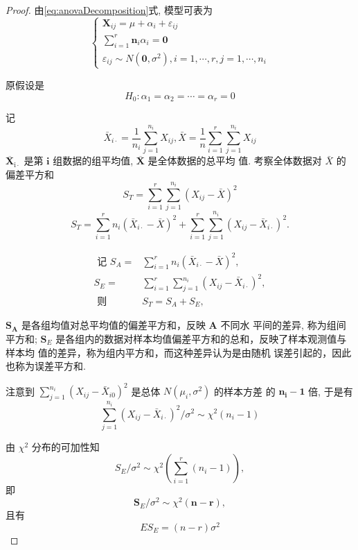 \begin{proof}
    由\cref{eq:anovaDecomposition}式, 模型可表为
    $$
    \left\{\begin{array}{l}
    \boldsymbol{X}_{i j}=\mu+\alpha_{i}+\varepsilon_{i j} \\
    \sum_{i=1}^{r} \boldsymbol{n}_{i} \alpha_{i}=\mathbf{0} \\
    \varepsilon_{i j} \sim N\left(\mathbf{0}, \sigma^{2}\right), i=1, \cdots, r, j=1, \cdots, n_{i}
    \end{array}\right.
    $$
    
    原假设是
    $$
    H_{0}: \alpha_{1}=\alpha_{2}=\cdots=\alpha_{r}=0
    $$
    
    记
    $$
    \bar{X}_{i \cdot}=\frac{1}{n_{i}} \sum_{j=1}^{n_{i}} X_{i j}, \bar{X}=\frac{1}{n} \sum_{i=1}^{r} \sum_{j=1}^{n_{i}} X_{i j}
    $$
    \( \overline{\boldsymbol{X}}_{\mathrm{i} \cdot} \) 是第 \( \boldsymbol{i} \) 组数据的组平均值, \( \overline{\boldsymbol{X}} \) 是全体数据的总平均
    值. 考察全体数据对 \( \bar{X} \) 的偏差平方和
    $$
    S_{T}=\sum_{i=1}^{r} \sum_{j=1}^{n_{i}}\left(X_{i j}-\bar{X}\right)^{2}
    $$
    $$
    S_{T}=\sum_{i=1}^{r} n_{i}\left(\bar{X}_{i \cdot}-\bar{X}\right)^{2}+\sum_{i=1}^{r} \sum_{j=1}^{n_{i}}\left(X_{i j}-\bar{X}_{i \cdot}\right)^{2} .
    $$
    
    $$ \begin{aligned} \text { 记 } S_{A}=& \sum_{i=1}^{r} n_{i}\left(\bar{X}_{i \cdot}-\bar{X}\right)^{2}, \\ S_{E}=& \sum_{i=1}^{r} \sum_{j=1}^{n_{i}}\left(X_{i j}-\bar{X}_{i \cdot}\right)^{2}, \\ \text { 则 } & S_{T}=S_{A}+S_{E}, \end{aligned} $$
    
    \( \boldsymbol{S}_{\boldsymbol{A}} \) 是各组均值对总平均值的偏差平方和，反映 \( \boldsymbol{A} \) 不同水
    平间的差异, 称为组间平方和; \( \boldsymbol{S}_{E} \) 是各组内的数据对样本均值偏差平方和的总和，反映了样本观测值与样本均
    值的差异，称为组内平方和，而这种差异认为是由随机
    误差引起的，因此也称为误差平方和. 
    
    注意到 \( \sum_{j=1}^{n_{i}}\left(X_{i j}-\bar{X}_{i 0}\right)^{2} \) 是总体 \( N\left(\mu_{i}, \sigma^{2}\right) \) 的样本方差
    的 \( \boldsymbol{n}_{\boldsymbol{i}}-\mathbf{1} \) 倍, 于是有
    $$
    \sum_{j=1}^{n_{i}}\left(X_{i j}-\bar{X}_{i \cdot}\right)^{2} / \sigma^{2} \sim \chi^{2}\left(n_{i}-1\right)
    $$
    
    由 \( \chi^{2} \) 分布的可加性知
    $$
    S_{E} / \sigma^{2} \sim \chi^{2}\left(\sum_{i=1}^{r}\left(n_{i}-1\right)\right),
    $$
    即
    $$
    \boldsymbol{S}_{E} / \sigma^{2} \sim \chi^{2}(\boldsymbol{n}-\boldsymbol{r}),
    $$
    且有
    $$
    E S_{E}=(n-r) \sigma^{2}
    $$
    

\end{proof}
